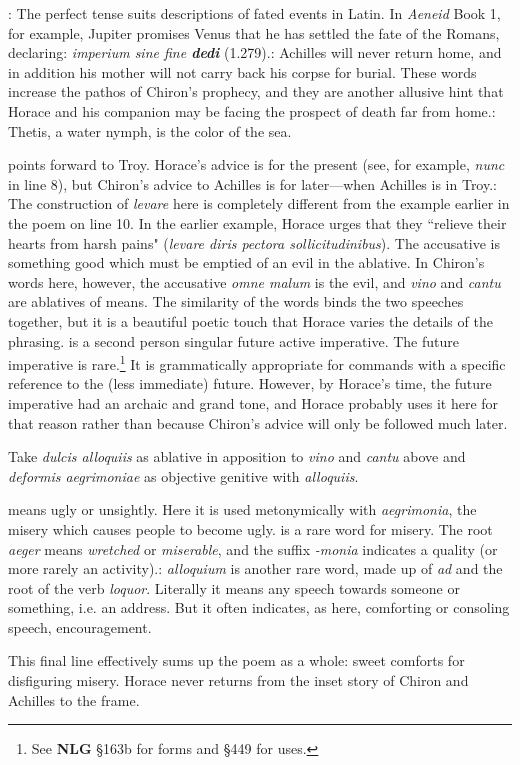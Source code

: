 
: The perfect tense suits descriptions of fated events in Latin.  In \textit{Aeneid} Book 1, for example, Jupiter promises Venus that he has settled the fate of the Romans, declaring: \textit{imperium sine fine \textbf{dedi}} (1.279).\indent{}: Achilles will never return home, and in addition his mother will not carry back his corpse for burial.  These words increase the pathos of Chiron's prophecy, and they are another allusive hint that Horace and his companion may be facing the prospect of death far from home.\indent{}: Thetis, a water nymph, is the color of the sea.


 points forward to Troy.  Horace's advice is for the present (see, for example, \textit{nunc} in line 8), but Chiron's advice to Achilles is for later---when Achilles is in Troy.\indent{}: The construction of \textit{levare} here is completely different from the example earlier in the poem on line 10.  In the earlier example, Horace urges that they ``relieve their hearts from harsh pains" (\textit{levare diris pectora sollicitudinibus}). The accusative is something good which must be emptied of an evil in the ablative.  In Chiron's words here, however, the accusative \textit{omne malum} is the evil, and \textit{vino} and \textit{cantu} are ablatives of means.  The similarity of the words binds the two speeches together, but it is a beautiful poetic touch that Horace varies the details of the phrasing.\indent{} is a second person singular future active imperative.  The future imperative is rare.\footnote{See \textbf{NLG} \S 163b for forms and \S 449 for uses.}  It is grammatically appropriate for commands with a specific reference to the (less immediate) future.  However, by Horace's time, the future imperative had an archaic and grand tone, and Horace probably uses it here for that reason rather than because Chiron's advice will only be followed much later.


Take \textit{dulcis alloquiis} as ablative in apposition to \textit{vino} and \textit{cantu} above and \textit{deformis aegrimoniae} as objective genitive with \textit{alloquiis}.


 means ugly or unsightly.  Here it is used metonymically with \textit{aegrimonia}, the misery which causes people to become ugly.\indent{} is a rare word for misery.  The root \textit{aeger} means \textit{wretched} or \textit{miserable}, and the suffix \textit{-monia} indicates a quality (or more rarely an activity).\indent{}: \textit{alloquium} is another rare word, made up of \textit{ad} and the root of the verb \textit{loquor}.  Literally it means any speech towards someone or something, i.e. an address.  But it often indicates, as here, comforting or consoling speech, encouragement.

This final line effectively sums up the poem as a whole: sweet comforts for disfiguring misery.  Horace never returns from the inset story of Chiron and Achilles to the frame.

